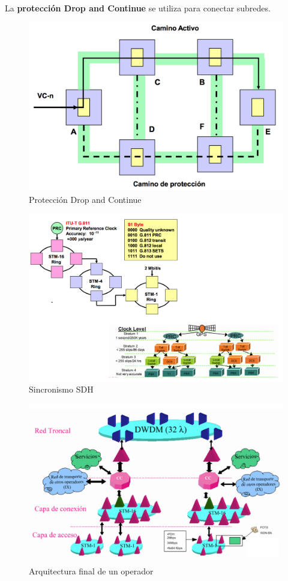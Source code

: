 \documentclass[10pt,portrait, twocolumn]{article}
\begin{document}
La \textbf{protección Drop and Continue} se utiliza para conectar subredes.

	\begin{figure}[!ht]
 		\centering
  		 \includegraphics[scale = 0.4]{images/Drop}
		\caption{Protección Drop and Continue}
	\end{figure}

	\begin{figure}[!ht]
 		\centering
  		 \includegraphics[scale = 0.4]{images/Sync}
		\caption{Sincronismo SDH}
	\end{figure}
	
	\begin{figure}[!ht]
 		\centering
  		 \includegraphics[scale = 0.4]{images/Final}
		\caption{Arquitectura final de un operador}
	\end{figure}
\end{document}
